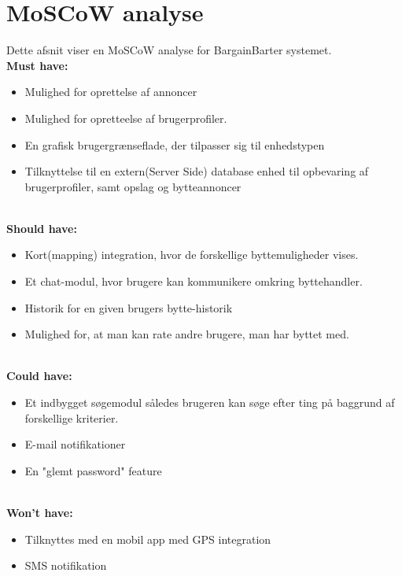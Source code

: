 \chapter{MoSCoW analyse}
Dette afsnit viser en MoSCoW analyse for BargainBarter systemet. \\
\textbf{Must have:}
\begin{itemize}[noitemsep]
	\item Mulighed for oprettelse af annoncer
	\item Mulighed for opretteelse af brugerprofiler.
	\item En grafisk brugergrænseflade, der tilpasser sig til enhedstypen
	\item Tilknyttelse til en extern(Server Side) database enhed til opbevaring af brugerprofiler, samt opslag og bytteannoncer 
	
\end{itemize}

\textbf{\\Should have:}
\begin{itemize}[noitemsep]
	\item Kort(mapping) integration, hvor de forskellige byttemuligheder vises.
	\item Et chat-modul, hvor brugere kan kommunikere omkring byttehandler.
	\item Historik for en given brugers bytte-historik
	\item Mulighed for, at man kan rate andre brugere, man har byttet med.
\end{itemize}

\textbf{\\Could have:}
\begin{itemize}[noitemsep]
	\item Et indbygget søgemodul således brugeren kan søge efter ting på baggrund af forskellige kriterier.
	\item E-mail notifikationer
	\item En "glemt password" feature
\end{itemize}

\textbf{\\Won't have:}
\begin{itemize}[noitemsep]
	\item Tilknyttes med en mobil app med GPS integration
	\item SMS notifikation 
\end{itemize}
